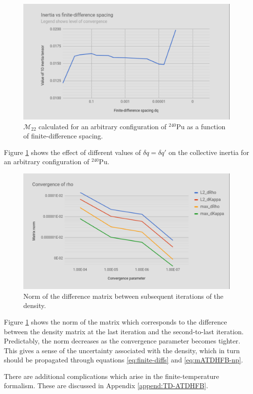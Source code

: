 \begin{figure}
	\centering
	\includegraphics[width=0.7\linewidth]{TeX_files/Num-dq_spacing}
	\caption[Collective inertia as a function of finite-difference spacing]{$\mathcal{M}_{22}$ calculated for an arbitrary configuration of $^{240}$Pu as a function of finite-difference spacing.}
	\label{fig:num-dqspacing}
\end{figure}

Figure \ref{fig:num-dqspacing} shows the effect of different values of $\delta q = \delta q'$ on the collective inertia for an arbitrary configuration of $^{240}$Pu.

\begin{figure}
	\centering
	\includegraphics[width=0.7\linewidth]{TeX_files/Num-rho_conv}
	\caption[Norm of the difference matrix between subsequent iterations of the density]{Norm of the difference matrix between subsequent iterations of the density.}
	\label{fig:num-rhoconv}
\end{figure}

Figure \ref{fig:num-dqspacing} shows the norm of the matrix which corresponds to the difference between the density matrix at the last iteration and the second-to-last iteration. Predictably, the norm decreases as the convergence parameter becomes tighter. This gives a sense of the uncertainty associated with the density, which in turn should be propagated through equations \eqref{eq:finite-diffs} and \eqref{eq:mATDHFB-np}.

There are additional complications which arise in the finite-temperature formalism. These are discussed in Appendix \ref{append:TD-ATDHFB}.

